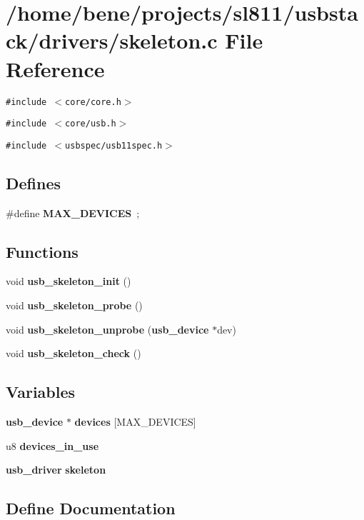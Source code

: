 \section{/home/bene/projects/sl811/usbstack/drivers/skeleton.c File Reference}
\label{skeleton_8c}
{\tt \#include $<$core/core.h$>$}\par
{\tt \#include $<$core/usb.h$>$}\par
{\tt \#include $<$usbspec/usb11spec.h$>$}\par
\subsection*{Defines}
\begin{CompactItemize}
\item 
\#define {\bf MAX\_\-DEVICES}~;
\end{CompactItemize}
\subsection*{Functions}
\begin{CompactItemize}
\item 
void {\bf usb\_\-skeleton\_\-init} ()
\item 
void {\bf usb\_\-skeleton\_\-probe} ()
\item 
void {\bf usb\_\-skeleton\_\-unprobe} ({\bf usb\_\-device} $\ast$dev)
\item 
void {\bf usb\_\-skeleton\_\-check} ()
\end{CompactItemize}
\subsection*{Variables}
\begin{CompactItemize}
\item 
{\bf usb\_\-device} $\ast$ {\bf devices} [MAX\_\-DEVICES]
\item 
u8 {\bf devices\_\-in\_\-use}
\item 
{\bf usb\_\-driver} {\bf skeleton}
\end{CompactItemize}


\subsection{Define Documentation}
